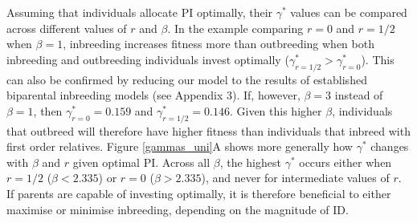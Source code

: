 \documentclass[12pt]{article}
\begin{document}
Assuming that individuals allocate PI optimally, their $\gamma^{*}$ values can be compared across different values of $r$ and $\beta$. In the example comparing $r=0$ and $r=1/2$ when $\beta=1$, inbreeding increases fitness more than outbreeding when both inbreeding and outbreeding individuals invest optimally ($\gamma^{*}_{r=1/2}>\gamma^{*}_{r=0}$). This can also be confirmed by reducing our model to the results of established biparental inbreeding models (see Appendix 3). If, however, $\beta=3$ instead of $\beta=1$, then $\gamma^{*}_{r=0}=0.159$ and $\gamma^{*}_{r=1/2}=0.146$. Given this higher $\beta$, individuals that outbreed will therefore have higher fitness than individuals that inbreed with first order relatives. Figure \ref{gammas_uni}A shows more generally how $\gamma^{*}$ changes with $\beta$ and $r$ given optimal PI. Across all $\beta$, the highest $\gamma^{*}$ occurs either when $r=1/2$ ($\beta < 2.335$) or $r=0$ ($\beta > 2.335$), and never for intermediate values of $r$. If parents are capable of investing optimally, it is therefore beneficial to either maximise or minimise inbreeding, depending on the magnitude of ID.
\end{document}
